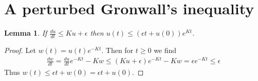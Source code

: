 \documentclass[12pt]{amsart}
\newtheorem{lem}[thm]{Lemma}
\begin{document}
\section{A perturbed Gronwall's inequality}
\begin{lem} \label{lem:Gronwall}
If $\frac{du}{dt} \leq Ku + \epsilon$ then $u(t) \leq (\epsilon t + u(0) ) e^{Kt}$.
\end{lem}
\begin{proof}
	Let $w (t)= u (t) e^{-Kt}$.  Then for $t \geq 0$ we find
	\begin{align*}
		\frac{dw}{dt} = \frac{du}{dt} e^{-Kt} - K w \leq (Ku+\epsilon) e^{-Kt} - Kw = \epsilon e^{-Kt} \leq \epsilon
	\end{align*}
	Thus $w(t) \leq \epsilon t + w(0) = \epsilon t + u(0)$.
\end{proof}



\end{document}
